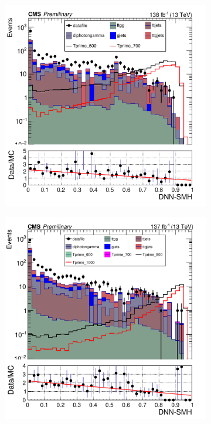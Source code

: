 \begin{figure}[H]
     \centering
     \begin{subfigure}[b]{0.3\textwidth}
         \centering
         \includegraphics[width=\textwidth, scale = 0.5 ]{figure_4/Stacked_plot_DNN_600-700_with_diphoton_cuts.pdf}
     \end{subfigure}
     \hfill
     \begin{subfigure}[b]{0.3\textwidth}
         \centering
         \includegraphics[width=\textwidth]{figure_4/Stacked_plot_DNN_800-1000_with_diphoton_cuts.pdf}

\end{subfigure}
\end{figure}
